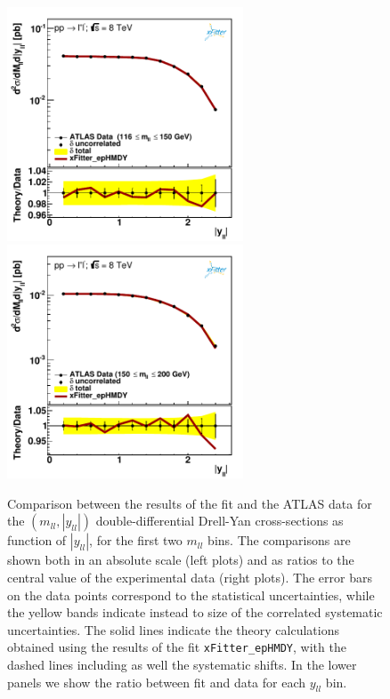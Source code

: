\begin{figure}[t]
\centering
\includegraphics[width=7cm]{figs/data_401-1.pdf}
\includegraphics[width=7cm]{figs/data_402-1.pdf}
\caption{Comparison between the results of the fit and the ATLAS data
  for the $(m_{ll},|y_{ll}|)$ double-differential Drell-Yan cross-sections
  as function of $|y_{ll}|$, for the first two $m_{ll}$ bins.
  The comparisons are shown both
  in an absolute scale (left plots) and as ratios to the central value
  of the experimental data (right plots).
  The error bars on the data points correspond to the statistical
  uncertainties, while the yellow bands
  indicate instead to size of the correlated systematic uncertainties.
  The solid lines indicate the theory calculations obtained using the results
  of the fit {\tt xFitter\_epHMDY}, with the dashed lines including as well the systematic shifts.
  In the lower panels we show the ratio between fit and data for each $y_{ll}$ bin.
}
\label{hmDY_2D_1}
\end{figure}

